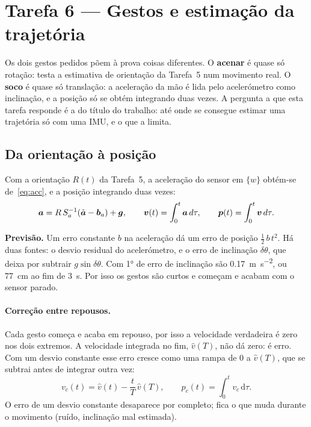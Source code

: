 \section{Tarefa 6 --- Gestos e estimação da trajetória}
\label{sec:gestos}

Os dois gestos pedidos põem à prova coisas diferentes. O \textbf{acenar} é
quase só rotação: testa a estimativa de orientação da Tarefa~5 num movimento
real. O \textbf{soco} é quase só translação: a aceleração da mão é lida pelo
acelerómetro como inclinação, e a posição só se obtém integrando duas vezes.
A pergunta a que esta tarefa responde é a do título do trabalho: até onde se
consegue estimar uma trajetória só com uma IMU, e o que a limita.

\subsection{Da orientação à posição}

Com a orientação $R(t)$ da Tarefa~5, a aceleração do sensor em $\{w\}$
obtém-se de~\eqref{eq:acc}, e a posição integrando duas vezes:
\begin{equation}
\boldsymbol{a} = R\,S_a^{-1}(\tilde{\boldsymbol{a}} - \boldsymbol{b}_a) + \boldsymbol{g}, \qquad
\boldsymbol{v}(t) = \int_0^t \boldsymbol{a}\,d\tau, \qquad
\boldsymbol{p}(t) = \int_0^t \boldsymbol{v}\,d\tau .
\label{eq:pos}
\end{equation}

\begin{destaque}
\textbf{Previsão.} Um erro constante $b$ na aceleração dá um erro de posição
$\tfrac12\,b\,t^2$. Há duas fontes: o desvio residual do acelerómetro, e o
erro de inclinação $\delta\theta$, que deixa por subtrair $g\sin\delta\theta$.
Com \ang{1} de erro de inclinação são \SI{0.17}{\meter\per\second\squared},
ou \SI{77}{\centi\meter} ao fim de \SI{3}{\second}. Por isso os gestos são
curtos e começam e acabam com o sensor parado.
\end{destaque}

\paragraph{Correção entre repousos.} Cada gesto começa e acaba em repouso,
por isso a velocidade verdadeira é zero nos dois extremos. A velocidade
integrada no fim, $\hat v(T)$, não dá zero: é erro. Com um desvio constante
esse erro cresce como uma rampa de $0$ a $\hat v(T)$, que se subtrai antes de
integrar outra vez:
\begin{equation}
v_c(t) = \hat v(t) - \frac{t}{T}\,\hat v(T), \qquad
p_c(t) = \int_0^t v_c\,\mathrm d\tau .
\label{eq:repousos}
\end{equation}
O erro de um desvio constante desaparece por completo; fica o que muda
durante o movimento (ruído, inclinação mal estimada). 

